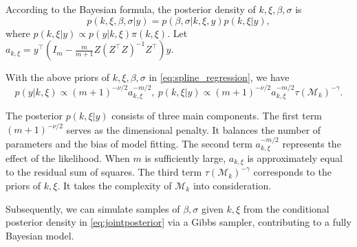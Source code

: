 According to the Bayesian formula, the posterior density of $k,\xi,\beta,\sigma$ is
\begin{equation}
    \label{eq:jointposterior}
    p(k,\xi,\beta,\sigma|y)=p(\beta,\sigma|k,\xi,y)p(k,\xi|y),
\end{equation}
where $p(k,\xi|y)\propto p(y|k,\xi)\pi(k,\xi)$. Let $a_{k,\xi}=y^\top (I_m-\frac{m}{m+1}Z(Z^\top Z)^{-1}Z^\top)y$.

\begin{lemma}
\label{lm:post}
    With the above priors of $k,\xi,\beta,\sigma$ in \eqref{eq:spline_regression}, we have
    \begin{equation}
        \label{eq:posterior}
        p(y|k,\xi)\propto (m+1)^{-\nu/2}a_{k,\xi}^{-m/2},~ p(k,\xi|y)\propto (m+1)^{-\nu/2}a_{k,\xi}^{-m/2} \tau(\mathcal{M}_k)^{-\gamma}.
    \end{equation}
\end{lemma}

The posterior $p(k,\xi|y)$ consists of three main components. The first term $(m+1)^{-\nu/2}$ serves as the dimensional penalty. It balances the number of parameters and the bias of model fitting. The second term $a_{k,\xi}^{-m/2}$ represents the effect of the likelihood. When $m$ is sufficiently large, $a_{k,\xi}$ is approximately equal to the residual sum of squares. The third term $\tau(\mathcal{M}_k)^{-\gamma}$ corresponds to the priors of $k,\xi$. It takes the complexity of $\mathcal{M}_k$ into consideration. %

Subsequently, we can simulate samples of $\beta,\sigma$ given $k,\xi$ from the conditional posterior density in \eqref{eq:jointposterior} via a Gibbs sampler, contributing to a fully Bayesian model.



